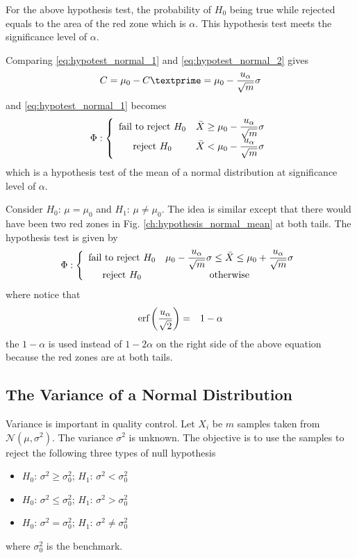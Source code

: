 For the above hypothesis test, the probability of $H_0$ being true while rejected equals to the area of the red zone which is $\alpha$. This hypothesis test meets the significance level of $\alpha$. 

Comparing \eqref{eq:hypotest_normal_1} and \eqref{eq:hypotest_normal_2} gives
\begin{eqnarray}
	C = \mu_0 - C\textprime = \mu_0 - \dfrac{u_\alpha}{\sqrt{m}}\sigma \nonumber
\end{eqnarray}
and \eqref{eq:hypotest_normal_1} becomes
\begin{eqnarray}
	\Phi : \left\{\begin{array}{cc}
		\textup{fail to reject~} H_0 & \bar{X} \geq \mu_0 - \dfrac{u_\alpha}{\sqrt{m}}\sigma \\
		\textup{reject~} H_0 & \bar{X} < \mu_0 - \dfrac{u_\alpha}{\sqrt{m}}\sigma
	\end{array}\right. \nonumber
\end{eqnarray}
which is a hypothesis test of the mean of a normal distribution at significance level of $\alpha$.

Consider $H_0$: $\mu = \mu_0$ and  $H_1$: $\mu \neq \mu_0$. The idea is similar except that there would have been two red zones in Fig. \ref{ch:hypothesis_normal_mean} at both tails. The hypothesis test is given by
\begin{eqnarray}
	\Phi : \left\{\begin{array}{cc}
		\textup{fail to reject~} H_0 & \mu_0 - \dfrac{u_\alpha}{\sqrt{m}}\sigma \leq \bar{X} \leq  \mu_0 + \dfrac{u_\alpha}{\sqrt{m}}\sigma \\
		\textup{reject~} H_0 & \textup{otherwise}
	\end{array}\right. \nonumber
\end{eqnarray}
where notice that 
\begin{eqnarray}
	\textup{erf}\left(\dfrac{u_\alpha}{\sqrt{2}}\right) &=& 1-\alpha \nonumber
\end{eqnarray}
the $1-\alpha$ is used instead of $1-2\alpha$ on the right side of the above equation because the red zones are at both tails.

\subsection{The Variance of a Normal Distribution}

Variance is important in quality control. Let $X_i$ be $m$ samples taken from $\mathcal{N}(\mu, \sigma^2)$. The variance $\sigma^2$ is unknown. The objective is to use the samples to reject the following three types of null hypothesis
\begin{itemize}
	\item $H_0$: $\sigma^2 \geq \sigma_0^2$; $H_1$: $\sigma^2 < \sigma_0^2$
	\item $H_0$: $\sigma^2 \leq \sigma_0^2$; $H_1$: $\sigma^2 > \sigma_0^2$
	\item $H_0$: $\sigma^2 = \sigma_0^2$; $H_1$: $\sigma^2 \neq \sigma_0^2$
\end{itemize}
where $\sigma_0^2$ is the benchmark.

